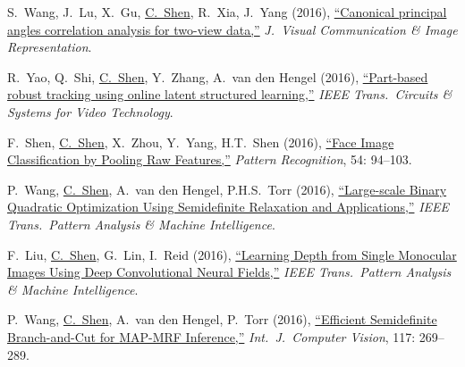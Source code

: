 \documentclass[9pt, a4paper]{article}
\newcommand{\years}[1]{\marginnote{\scriptsize #1}}
\def\highlight{\uline}
\begin{document}
\medskip

\years{2016} S.~Wang, J.~Lu, X.~Gu, \highlight{C.~Shen}, R.~Xia, J.~Yang (2016),
\href{http://www.google.com/search?lr=&ie=UTF-8&oe=UTF-8&q=Canonical+principal+angles+correlation+analysis+for+two-view+data+Sheng+Wang%2C+Jianfeng+Lu%2C+Xingjian+Gu%2C+Chunhua+Shen%2C+Rui+Xia%2C+Jingyu+Yang}{``Canonical principal angles correlation analysis for two-view data,{}''}
\emph{J.\  Visual Communication \& Image Representation}.

\medskip

\years{2016} R.~Yao, Q.~Shi, \highlight{C.~Shen}, Y.~Zhang, A.~van den Hengel (2016),
\href{http://www.google.com/search?lr=&ie=UTF-8&oe=UTF-8&q=Part-based+robust+tracking+using+online+latent+structured+learning+Rui+Yao%2C+Qinfeng+Shi%2C+Chunhua+Shen%2C+Yanning+Zhang%2C+Anton+van+den+Hengel}{``Part-based robust tracking using online latent structured learning,{}''}
\emph{IEEE Trans.\  Circuits \& Systems for Video Technology}.

\medskip

\years{2016} F.~Shen, \highlight{C.~Shen}, X.~Zhou, Y.~Yang, H.T.~Shen (2016),
\href{http://www.google.com/search?lr=&ie=UTF-8&oe=UTF-8&q=Face+Image+Classification+by+Pooling+Raw+Features+Fumin+Shen%2C+Chunhua+Shen%2C+Xiang+Zhou%2C+Yang+Yang%2C+Heng+Tao+Shen}{``Face Image Classification by Pooling Raw Features,{}''}
\emph{Pattern Recognition}, 54: 94--103.

\medskip

\years{2016} P.~Wang, \highlight{C.~Shen}, A.~van den Hengel, P.H.S.~Torr (2016),
\href{http://www.google.com/search?lr=&ie=UTF-8&oe=UTF-8&q=Large-scale+Binary+Quadratic+Optimization+Using+Semidefinite+Relaxation+and+Applications+Peng+Wang%2C+Chunhua+Shen%2C+Anton+van+den+Hengel%2C+Philip+H.+S.+Torr}{``Large-scale Binary Quadratic Optimization Using Semidefinite Relaxation and Applications,{}''}
\emph{IEEE Trans.\  Pattern Analysis \& Machine Intelligence}.

\medskip

\years{2016} F.~Liu, \highlight{C.~Shen}, G.~Lin, I.~Reid (2016),
\href{http://www.google.com/search?lr=&ie=UTF-8&oe=UTF-8&q=Learning+Depth+from+Single+Monocular+Images+Using+Deep+Convolutional+Neural+Fields+Fayao+Liu%2C+Chunhua+Shen%2C+Guosheng+Lin%2C+Ian+Reid}{``Learning Depth from Single Monocular Images Using Deep Convolutional Neural Fields,{}''}
\emph{IEEE Trans.\  Pattern Analysis \& Machine Intelligence}.

\medskip

\years{2016} P.~Wang, \highlight{C.~Shen}, A.~van den Hengel, P.~Torr (2016),
\href{http://www.google.com/search?lr=&ie=UTF-8&oe=UTF-8&q=Efficient+Semidefinite+Branch-and-Cut+for+MAP-MRF+Inference+Peng+Wang%2C+Chunhua+Shen%2C+Anton+van+den+Hengel%2C+Philip+Torr}{``Efficient Semidefinite Branch-and-Cut for {MAP-MRF} Inference,{}''}
\emph{Int.\ J.\  Computer Vision}, 117: 269--289.
\end{document}
